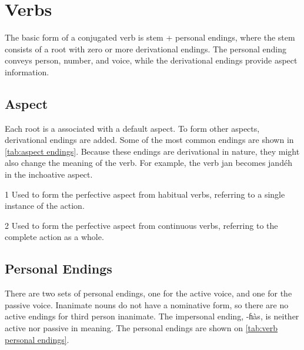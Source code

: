 \section{Verbs}
The basic form of a conjugated verb is stem + personal endings, where the stem
consists of a root with zero or more derivational endings.
The personal ending conveys person, number, and voice, while the derivational
endings provide aspect information.

\subsection{Aspect}
Each root is a associated with a default aspect.
To form other aspects, derivational endings are added.
Some of the most common endings are shown in \cref{tab:aspect endings}.
Because these endings are derivational in nature, they might also change the
meaning of the verb.
For example, the verb {\ll jan}  becomes {\ll jandéh} 
in the inchoative aspect.

\begin{table}[h]
\centering
\caption{Aspect Endings}
\label{tab:aspect endings}
\begin{threeparttable}
\begin{tablenotes}
\item[1] Used to form the perfective aspect from habitual verbs, referring to a
    single instance of the action.
\item[2] Used to form the perfective aspect from continuous verbs, referring to
    the complete action as a whole.
\end{tablenotes}
\end{threeparttable}
\end{table}

\subsection{Personal Endings}
There are two sets of personal endings, one for the active voice, and one for
the passive voice.
Inanimate nouns do not have a nominative form, so there are no active endings
for third person inanimate.
The impersonal ending, {\ll -ɦàs}, is neither active nor passive in meaning.
The personal endings are shown on \cref{tab:verb personal endings}.

